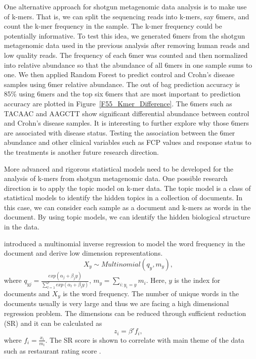 One alternative approach for shotgun metagenomic data analysis is to make use of k-mers. That is, we can split the sequencing reads into k-mers, say 6mers, and count the k-mer frequency in the sample. The k-mer frequency could be potentially informative. To test this idea, we generated 6mers from the shotgun metagenomic data used in the previous analysis after removing human reads and low quality reads.  The  frequency of each 6mer was counted and then normalized into relative abundance so that the abundance of all 6mers in one sample sums to one. We then applied Random Forest to predict control and Crohn's disease samples using 6mer relative abundance. The out of bag prediction accuracy is 85\% using 6mers and the top six 6mers that are most important to prediction accuracy are plotted in Figure~\ref{F55_Kmer_Difference}. The 6mers such as TACAAC and AAGCTT show significant differential abundance between control and Crohn's disease samples. It is interesting to further explore why those 6mers are associated with disease status. Testing the association between the 6mer abundance and other clinical variables such as FCP values and response status to the treatments is another future research direction. 

More advanced and rigorous statistical models need to be developed for the analysis of k-mers from shotgun metagenomic data. One possible research direction is to apply the topic model on k-mer data. The topic model is a class of statistical models to identify the hidden topics in a collection of documents. In this case, we can consider each sample as a document and k-mers as words in the document. By using topic models, we can identify the hidden biological structure in the data. 

\citet{taddy2013multinomial} introduced a multinomial inverse regression to model the word frequency in the document and derive low dimension representations.
\begin{equation*}
X_y \sim Multinomial(q_y,m_y),
\end{equation*}
where $q_{yj} = \frac{exp(\alpha_j+\beta_jy)}{\sum_{l=1}^{p}exp(\alpha_l+\beta_ly)}$,
$m_y = \sum_{i:y_i=y}m_i$.
Here, $y$ is the index for documents and $X_y$ is the word frequency.
The number of unique words in the documents usually is very large and thus we are facing a high dimensional regression problem. The dimensions  can be reduced through sufficient reduction (SR) and it can be calculated as 
\begin{equation*}
z_i = \beta'f_i,
\end{equation*}
where $f_i = \frac{x_i}{m_i}$.
The SR score is shown to correlate with main theme of the data such as restaurant rating score \citep{taddy2013multinomial}. 

